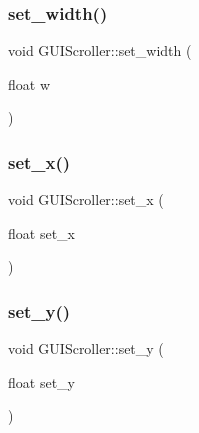 \hypertarget{class_g_u_i_scroller_af3bc0899bd60c4ed343b61e85b534d49}{}\label{class_g_u_i_scroller_af3bc0899bd60c4ed343b61e85b534d49} 
\subsubsection{\texorpdfstring{set\+\_\+width()}{set\_width()}}
{\footnotesize\ttfamily void G\+U\+I\+Scroller\+::set\+\_\+width (\begin{DoxyParamCaption}\item[{float}]{w }\end{DoxyParamCaption})}

\hypertarget{class_g_u_i_scroller_a1ac31bd416b07f2eab1ec4f3ecf57544}{}\label{class_g_u_i_scroller_a1ac31bd416b07f2eab1ec4f3ecf57544} 
\subsubsection{\texorpdfstring{set\+\_\+x()}{set\_x()}}
{\footnotesize\ttfamily void G\+U\+I\+Scroller\+::set\+\_\+x (\begin{DoxyParamCaption}\item[{float}]{set\+\_\+x }\end{DoxyParamCaption})}

\hypertarget{class_g_u_i_scroller_a443a8a0e2b343f18b8e3929fdb21a6d6}{}\label{class_g_u_i_scroller_a443a8a0e2b343f18b8e3929fdb21a6d6} 
\subsubsection{\texorpdfstring{set\+\_\+y()}{set\_y()}}
{\footnotesize\ttfamily void G\+U\+I\+Scroller\+::set\+\_\+y (\begin{DoxyParamCaption}\item[{float}]{set\+\_\+y }\end{DoxyParamCaption})}

\hypertarget{class_g_u_i_scroller_aeb74c7335c4ae5e73a96bf42e1d0910e}{}\label{class_g_u_i_scroller_aeb74c7335c4ae5e73a96bf42e1d0910e} 
